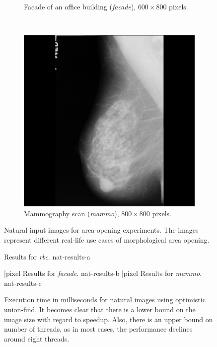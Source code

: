 \begin{figure}
{\begin{subfigure}{0.3\textwidth}
      \caption{Facade of an office building (\emph{facade}), $600 \times 800$ pixels.}
      \label{fig:nat-b}
    \end{subfigure}
    ~
    \begin{subfigure}{0.3\textwidth}
      \includegraphics[width=\textwidth]{../data/natural003.jpg}
      \caption{Mammography scan (\emph{mammo}), $800 \times 800$ pixels.}
      \label{fig:nat-c}
    \end{subfigure}
  } %

  \caption[Natural input images for area-opening experiments.]{Natural input
    images for area-opening experiments. The images represent different
    real-life use cases of morphological area opening.}
  \label{fig:nat}
\end{figure}

\begin{figure}
  \centering
  \plotsingle
  {\natone\ms\opt}
  {Results for \emph{rbc}.}
  {nat-results-a}

  \plotrow
  {\nattwo\ms\opt|pixel}
  {Results for \emph{facade}.}
  {nat-results-b}
  {\natthree\ms\opt|pixel}
  {Results for \emph{mammo}.}
  {nat-results-c}
  \caption[Execution time in milliseconds for natural images using optimistic
  union-find.]{Execution time in milliseconds for natural images using
    optimistic union-find. It becomes clear that there is a lower bound on the
    image size with regard to speedup. Also, there is an upper bound on number
    of threads, as in most cases, the performance declines around eight
    threads.}
  \label{fig:nat-results}
\end{figure}

